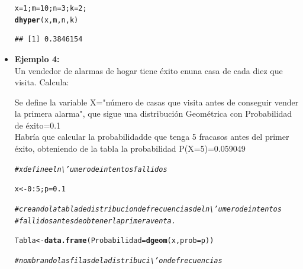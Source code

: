 \documentclass[12pt,letterpaper]{article}\usepackage[]{graphicx}\usepackage[]{color}
\makeatletter
\newcommand{\hlnum}[1]{\textcolor[rgb]{0.686,0.059,0.569}{#1}}%
\newcommand{\hlcom}[1]{\textcolor[rgb]{0.678,0.584,0.686}{\textit{#1}}}%
\newcommand{\hlopt}[1]{\textcolor[rgb]{0,0,0}{#1}}%
\newcommand{\hlstd}[1]{\textcolor[rgb]{0.345,0.345,0.345}{#1}}%
\newcommand{\hlkwb}[1]{\textcolor[rgb]{0.69,0.353,0.396}{#1}}%
\newcommand{\hlkwc}[1]{\textcolor[rgb]{0.333,0.667,0.333}{#1}}%
\newcommand{\hlkwd}[1]{\textcolor[rgb]{0.737,0.353,0.396}{\textbf{#1}}}%
\newenvironment{kframe}{%
 \def\at@end@of@kframe{}%
 \ifinner\ifhmode%
  \def\at@end@of@kframe{\end{minipage}}%
  \begin{minipage}{\columnwidth}%
 \fi\fi%
 \def\FrameCommand##1{\hskip\@totalleftmargin \hskip-\fboxsep
 \colorbox{shadecolor}{##1}\hskip-\fboxsep
     \hskip-\linewidth \hskip-\@totalleftmargin \hskip\columnwidth}%
 \MakeFramed {\advance\hsize-\width
   \@totalleftmargin\z@ \linewidth\hsize
   \@setminipage}}%
 {\par\unskip\endMakeFramed%
 \at@end@of@kframe}
\newenvironment{knitrout}{}{} %
\makeatother
\begin{document}
\begin{itemize}
\begin{knitrout}
\color{fgcolor}\begin{kframe}
\begin{alltt}
\hlstd{x} \hlkwb{=} \hlnum{1}\hlstd{; m}\hlkwb{=} \hlnum{10}\hlstd{; n}\hlkwb{=} \hlnum{3}\hlstd{; k}\hlkwb{=} \hlnum{2}\hlstd{;}
\hlkwd{dhyper}\hlstd{(x, m, n, k)}
\end{alltt}
\begin{verbatim}
## [1] 0.3846154
\end{verbatim}
\end{kframe}
\end{knitrout}

\item \textbf{Ejemplo 4:}\\
Un vendedor de alarmas de hogar tiene \'exito enuna casa de cada diez que visita. 
Calcula:


Se define la variable X="n\'umero de casas que visita antes de conseguir vender la primera alarma", que sigue una distribuci\'on Geom\'etrica con Probabilidad de \'exito=0.1 \\

Habr\'ia que calcular la probabilidadde que tenga 5 fracasos antes del primer \'exito, obteniendo de la tabla la probabilidad P(X=5)=0.059049

\begin{knitrout}
\color{fgcolor}\begin{kframe}
\begin{alltt}
\hlcom{# x define el n\textbackslash{}'umero de intentos fallidos}

\hlstd{x} \hlkwb{<-} \hlnum{0}\hlopt{:}\hlnum{5}\hlstd{; p}\hlkwb{=}\hlnum{0.1}

\hlcom{# creando la tabla de distribucion de frecuencias del n\textbackslash{}'umero de intentos }
\hlcom{# fallidos antes de obtener la primera venta. }

\hlstd{Tabla} \hlkwb{<-} \hlkwd{data.frame}\hlstd{(}\hlkwc{Probabilidad}\hlstd{=}\hlkwd{dgeom}\hlstd{(x,} \hlkwc{prob}\hlstd{=p))}

\hlcom{# nombrando las filas de la distribuci\textbackslash{}'on de frecuencias}


\end{alltt}
\end{kframe}
\end{knitrout}
\end{itemize}
\end{document}
